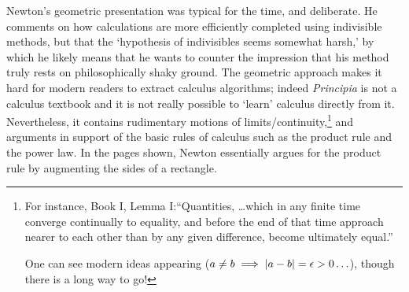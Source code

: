 Newton's geometric presentation was typical for the time, and deliberate. He comments on how calculations are more efficiently completed using indivisible methods, but that the `hypothesis of indivisibles seems somewhat harsh,' by which he likely means that he wants to counter the impression that his method truly rests on philosophically shaky ground. The geometric approach makes it hard for modern readers to extract calculus algorithms; indeed \emph{Principia} is not a calculus textbook and it is not really possible to `learn' calculus directly from it. Nevertheless, it contains rudimentary motions of limits/continuity,\footnote{For instance, Book I, Lemma I:\lstsp ``Quantities, \ldots which in any finite time converge continually to equality, and before the end of that time approach nearer to each other than by any given difference, become ultimately equal.''\par
One can see modern ideas appearing ($a\neq b\implies \left| a-b\right|=\epsilon>0\ldots$), though there is a long way to go!} and arguments in support of the basic rules of calculus such as the product rule and the power law. In the pages shown, Newton essentially argues for the product rule by augmenting the sides of a rectangle.


